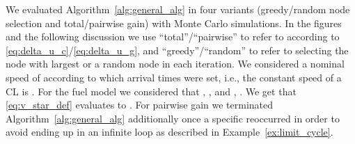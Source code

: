 \documentclass[letterpaper,10pt,conference,twocolumn]{IEEEtran}
\theoremstyle{definition}
\begin{document}
We evaluated Algorithm~\ref{alg:general_alg} in four variants (greedy/random node selection and total/pairwise gain) with Monte Carlo simulations. In the figures and the following discussion we use ``total''/``pairwise'' to refer to  according to \eqref{eq:delta_u_c}/\eqref{eq:delta_u_g}, and ``greedy''/``random'' to refer to selecting the node with largest  or a random node in each iteration. 
We considered a nominal speed of  according to which arrival times were set,  i.e., the constant speed of a CL  is .  
For the fuel model we considered that , , and , . We get that \eqref{eq:v_star_def} evaluates to .
For pairwise gain we terminated Algorithm~\ref{alg:general_alg} additionally once a specific  reoccurred in order to avoid ending up in an infinite loop as described in Example~\ref{ex:limit_cycle}. 

\begin{figure}
  \begin{center}

\end{center}
\end{figure}
\end{document}

